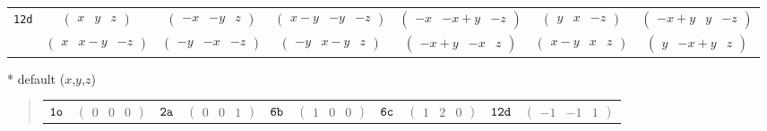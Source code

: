 \documentclass[fleqn,9pt,landscape]{jsarticle}
\begin{document}
\begin{center}
\begin{longtable}{ccccccc}
{\tt 12d} & $ \begin{pmatrix} x & y & z \end{pmatrix} $ & $ \begin{pmatrix} - x & - y & z \end{pmatrix} $ & $ \begin{pmatrix} x - y & - y & - z \end{pmatrix} $ & $ \begin{pmatrix} - x & - x + y & - z \end{pmatrix} $ & $ \begin{pmatrix} y & x & - z \end{pmatrix} $ & $ \begin{pmatrix} - x + y & y & - z \end{pmatrix} $ \\
& $ \begin{pmatrix} x & x - y & - z \end{pmatrix} $ & $ \begin{pmatrix} - y & - x & - z \end{pmatrix} $ & $ \begin{pmatrix} - y & x - y & z \end{pmatrix} $ & $ \begin{pmatrix} - x + y & - x & z \end{pmatrix} $ & $ \begin{pmatrix} x - y & x & z \end{pmatrix} $ & $ \begin{pmatrix} y & - x + y & z \end{pmatrix} $ \\
\end{longtable}
\end{center}
* default ($x$,$y$,$z$)
\begin{quote}
\begin{tabular}{cccccccccc}
$ {\tt 1o} $ & $ \begin{pmatrix} 0 & 0 & 0 \end{pmatrix} $ & $ {\tt 2a} $ & $ \begin{pmatrix} 0 & 0 & 1 \end{pmatrix} $ & $ {\tt 6b} $ & $ \begin{pmatrix} 1 & 0 & 0 \end{pmatrix} $ & $ {\tt 6c} $ & $ \begin{pmatrix} 1 & 2 & 0 \end{pmatrix} $ & $ {\tt 12d} $ & $ \begin{pmatrix} -1 & -1 & 1 \end{pmatrix} $
\end{tabular}
\end{quote}
\end{document}
